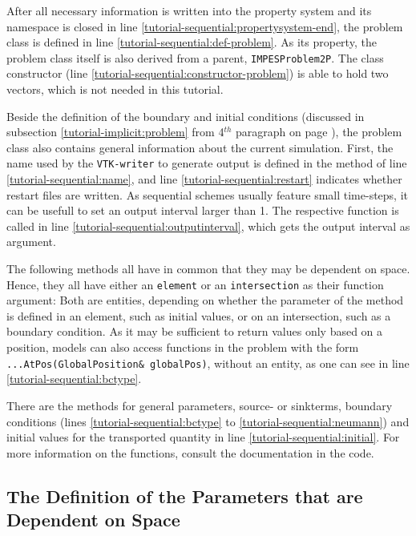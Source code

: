 After all necessary information is written into the property system and
its namespace is closed in line \ref{tutorial-sequential:propertysystem-end},
the problem class is defined in line \ref{tutorial-sequential:def-problem}.
As its property, the problem class itself is also derived from a parent,
\texttt{IMPESProblem2P}. The class constructor (line
\ref{tutorial-sequential:constructor-problem}) is able to hold two vectors,
which is not needed in this tutorial.

Beside the definition of the boundary and initial conditions (discussed in
subsection \ref{tutorial-implicit:problem} from 4$^{th}$ paragraph on page
\pageref{tutorial-implicit:boundaryStart}), the problem class also contains
general information about the current simulation. First, the name used by
the \texttt{VTK-writer} to generate output is defined in the method of line
\ref{tutorial-sequential:name}, and line \ref{tutorial-sequential:restart} indicates
whether restart files are written. As sequential schemes usually feature small
time-steps, it can be usefull to set an output interval larger than 1. The respective
function is called in line \ref{tutorial-sequential:outputinterval}, which gets the output interval as argument.

The following methods all have in common that they may be dependent on space.
Hence, they all have either an \texttt{element} or an \texttt{intersection} as their
function argument: Both are \Dune entities, depending on whether the parameter of
the method is defined in an element, such as
    initial values, or on an intersection, such as a boundary condition. As it may
    be sufficient to return values only based on a position, \Dumux models can also
    access functions in the problem with the form \mbox{\texttt{...AtPos(GlobalPosition\& globalPos)}},
    without an \Dune entity, as one can see in line \ref{tutorial-sequential:bctype}.

There are the methods for general parameters, source- or
sinkterms, boundary conditions (lines \ref{tutorial-sequential:bctype} to
\ref{tutorial-sequential:neumann}) and initial values for the transported
quantity in line \ref{tutorial-sequential:initial}. For more information
on the functions, consult the documentation in the code.

\subsection{The Definition of the Parameters that are Dependent on Space}\label{tutorial-sequential:description-spatialParameters}

